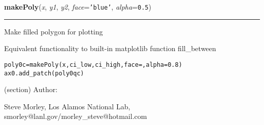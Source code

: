 \hspace{.8\funcindent}\begin{boxedminipage}{\funcwidth}

    \raggedright \textbf{makePoly}(\textit{x}, \textit{y1}, \textit{y2}, \textit{face}={\tt \texttt{'}\texttt{blue}\texttt{'}}, \textit{alpha}={\tt 0.5})

    \vspace{-1.5ex}

    \rule{\textwidth}{0.5\fboxrule}
\setlength{\parskip}{2ex}
    Make filled polygon for plotting

    Equivalent functionality to built-in matplotlib function fill\_between

\begin{alltt}
\pysrcprompt{{\textgreater}{\textgreater}{\textgreater} }poly0c = makePoly(x, ci\_low, ci\_high, face=, alpha=0.8)
\pysrcprompt{{\textgreater}{\textgreater}{\textgreater} }ax0.add\_patch(poly0qc)\end{alltt}
    (section) Author:

      Steve Morley, Los Alamos National Lab, 
      smorley@lanl.gov/morley\_steve@hotmail.com

\setlength{\parskip}{1ex}
    \end{boxedminipage}

    \label{spacepy:toolbox:binHisto}

    \vspace{0.5ex}

